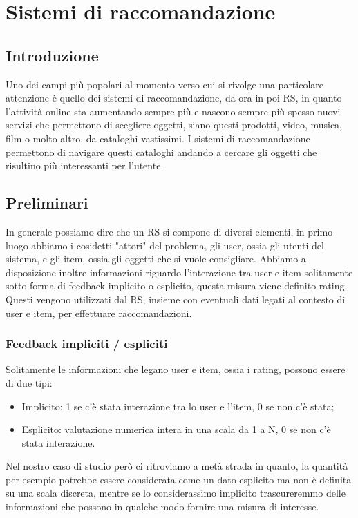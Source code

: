 
\hypertarget{(chap:capitolo4)}{}
\chapter{Sistemi di raccomandazione}
\section{Introduzione}
Uno dei campi più popolari al momento verso cui si rivolge una particolare attenzione è quello dei sistemi di raccomandazione, da ora in poi RS, in quanto l'attività online sta aumentando sempre più e nascono sempre più spesso nuovi servizi che permettono di scegliere oggetti, siano questi prodotti, video, musica, film o molto altro, da cataloghi vastissimi. I sistemi di raccomandazione permettono di navigare questi cataloghi andando a cercare gli oggetti che risultino più interessanti per l'utente.

\section{Preliminari}
In generale possiamo dire che un RS si compone di diversi elementi, in primo luogo abbiamo i cosidetti "attori" del problema, gli user, ossia gli utenti del sistema, e gli item, ossia gli oggetti che si vuole consigliare. Abbiamo a disposizione inoltre informazioni riguardo l'interazione tra user e item solitamente sotto forma di feedback implicito o esplicito, questa misura viene definito rating. Questi vengono utilizzati dal RS, insieme con eventuali dati legati al contesto di user e item, per effettuare raccomandazioni.

\subsection{Feedback impliciti / espliciti}
Solitamente le informazioni che legano user e item, ossia i rating, possono essere di due tipi:
\begin{itemize}
	\item Implicito: 1 se c'è stata interazione tra lo user e l'item, 0 se non c'è stata;
	\item Esplicito: valutazione numerica intera in una scala da 1 a N, 0 se non c'è stata interazione.
\end{itemize}

Nel nostro caso di studio però ci ritroviamo a metà strada in quanto, la quantità per esempio potrebbe essere considerata come un dato esplicito ma non è definita su una scala discreta, mentre se lo considerassimo implicito trascureremmo delle informazioni che possono in qualche modo fornire una misura di interesse.

